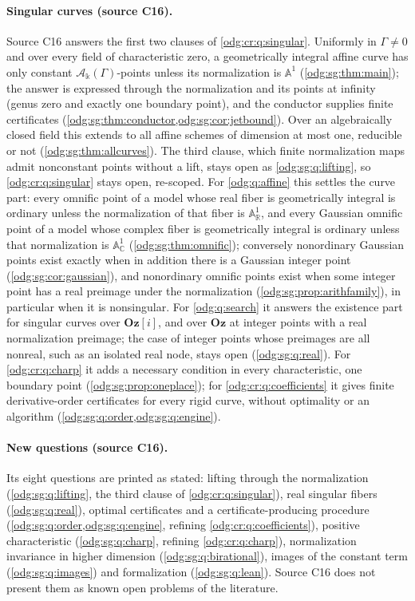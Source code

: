 \documentclass[11pt,oneside]{article}
\numberwithin{equation}{section}
\theoremstyle{definition}
\theoremstyle{remark}
\newcommand{\Oz}{\mathbf{Oz}}
\newcommand{\R}{\mathbb R}
\newcommand{\C}{\mathbb C}
\newcommand{\Og}{\Oz[i]}
\newcommand{\crA}{\mathcal A_\Bbbk(\Gamma)}
\newcommand{\Aff}{\mathbb A}
\begin{document}
\paragraph{Singular curves (source C16).} Source C16 answers the first two clauses of
\cref{odg:cr:q:singular}. Uniformly in $\Gamma\ne0$ and over every field of characteristic
zero, a geometrically integral affine curve has only constant $\crA$-points unless its
normalization is $\Aff^1$ (\cref{odg:sg:thm:main}); the answer is expressed through the
normalization and its points at infinity (genus zero and exactly one boundary point), and
the conductor supplies finite certificates (\cref{odg:sg:thm:conductor,odg:sg:cor:jetbound}).
Over an algebraically closed field this extends to all affine schemes of dimension at
most one, reducible or not (\cref{odg:sg:thm:allcurves}). The third clause, which finite
normalization maps admit nonconstant points without a lift, stays open as
\cref{odg:sg:q:lifting}, so \cref{odg:cr:q:singular} stays open, re-scoped. For
\cref{odg:q:affine} this settles the curve part: every omnific point of a model whose real
fiber is geometrically integral is ordinary unless the normalization of that fiber is
$\Aff^1_\R$, and every Gaussian omnific point of a model whose complex fiber is
geometrically integral is ordinary unless that normalization is $\Aff^1_\C$
(\cref{odg:sg:thm:omnific}); conversely nonordinary Gaussian points exist exactly when in
addition there is a Gaussian integer point (\cref{odg:sg:cor:gaussian}), and nonordinary
omnific points exist when some integer point has a real preimage under the normalization
(\cref{odg:sg:prop:arithfamily}), in particular when it is nonsingular. For
\cref{odg:q:search} it answers the existence part for singular curves over $\Og$, and
over $\Oz$ at integer points with a real normalization preimage; the case of integer
points whose preimages are all nonreal, such as an isolated real node, stays open
(\cref{odg:sg:q:real}). For \cref{odg:cr:q:charp} it adds a necessary condition in every
characteristic, one boundary point (\cref{odg:sg:prop:oneplace}); for
\cref{odg:cr:q:coefficients} it gives finite derivative-order certificates for every
rigid curve, without optimality or an algorithm (\cref{odg:sg:q:order,odg:sg:q:engine}).

\paragraph{New questions (source C16).} Its eight questions are printed as stated:
lifting through the normalization (\cref{odg:sg:q:lifting}, the third clause of
\cref{odg:cr:q:singular}), real singular fibers (\cref{odg:sg:q:real}), optimal
certificates and a certificate-producing procedure (\cref{odg:sg:q:order,odg:sg:q:engine},
refining \cref{odg:cr:q:coefficients}), positive characteristic (\cref{odg:sg:q:charp},
refining \cref{odg:cr:q:charp}), normalization invariance in higher dimension
(\cref{odg:sg:q:birational}), images of the constant term (\cref{odg:sg:q:images}) and
formalization (\cref{odg:sg:q:lean}). Source C16 does not present them as known open
problems of the literature.
\end{document}
